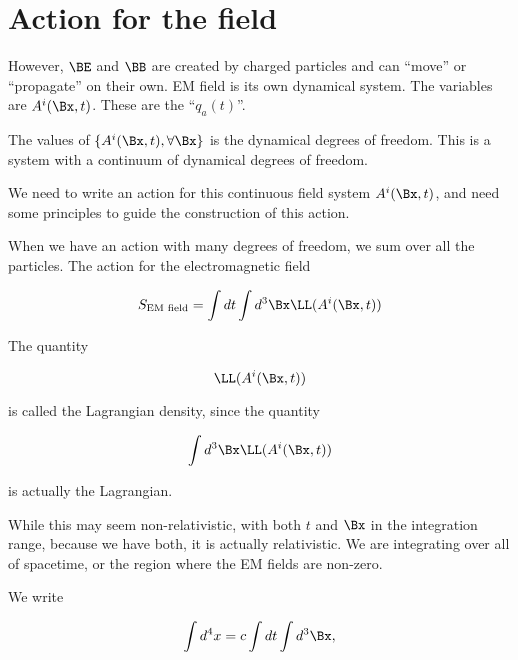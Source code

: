 %
%
\section{Action for the field}

However, \(\BE\) and \(\BB\) are created by charged particles and can ``move'' or ``propagate'' on their own.  EM field is its own dynamical system.  The variables are \(A^i(\Bx, t)\).  These are the ``\(q_a(t)\)''.

The values of \(\{A^i(\Bx, t), \forall \Bx\}\) is the dynamical degrees of freedom.  This is a system with a continuum of dynamical degrees of freedom.

We need to write an action for this continuous field system \(A^i(\Bx,t)\), and need some principles to guide the construction of this action.

When we have an action with many degrees of freedom, we sum over all the particles.  The action for the electromagnetic field 

\begin{equation}\label{eqn:relativisticElectrodynamicsL12b:90}
S_{\text{EM field}} = \int dt \int d^3\Bx \LL(A^i(\Bx, t))
\end{equation}

The quantity 

\begin{equation}\label{eqn:relativisticElectrodynamicsL12b:110}
\LL(A^i(\Bx, t))
\end{equation}

is called the Lagrangian density, since the quantity

\begin{equation}\label{eqn:relativisticElectrodynamicsL12b:130}
\int d^3\Bx \LL(A^i(\Bx, t))
\end{equation}

is actually the Lagrangian.

While this may seem non-relativistic, with both \(t\) and \(\Bx\) in the integration range, because we have both, it is actually relativistic.  We are integrating over all of spacetime, or the region where the EM fields are non-zero.

We write

\begin{equation}\label{eqn:relativisticElectrodynamicsL12b:150}
\int d^4 x  = c \int dt \int d^3 \Bx,
\end{equation}

